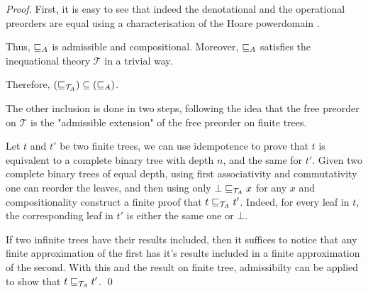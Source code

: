 \begin{proof}
    First, it is easy to see that indeed the denotational
    and the operational preorders are equal using 
    a characterisation of the Hoare powerdomain \cite{abramsky1994}.

    Thus, $\sqsubseteq_A$ is admissible and compositional. Moreover,
    $\sqsubseteq_A$ satisfies the inequational 
    theory $\mathcal{T}$ in a trivial way.

    Therefore, $(\sqsubseteq_{\mathcal{T}_A}) \subseteq (\sqsubseteq_A)$.

    The other inclusion is done in two steps, following the 
    idea that the free preorder on $\mathcal{T}$ is
    the "admissible extension" of the free preorder on finite 
    trees.
    
    Let $t$ and $t'$ be two finite trees, we can use 
    idempotence to prove that $t$ is equivalent to 
    a complete binary tree with depth $n$, and 
    the same for $t'$. Given two complete binary
    trees of equal depth, using first associativity 
    and commutativity one can reorder the leaves, and 
    then using only $\bot \sqsubseteq_{\mathcal{T}_A} x$ for any
    $x$ and compositionality construct 
    a finite proof that $t \sqsubseteq_{\mathcal{T}_A} t'$.
    Indeed, for every leaf in $t$, the corresponding 
    leaf in $t'$ is either the same one or $\bot$.

    
    If two infinite trees have their results included,
    then it suffices to notice that any finite approximation 
    of the first has it's results included in a finite 
    approximation of the second. With this and the result 
    on finite tree, admissibilty can be applied to 
    show that $t \sqsubseteq_{\mathcal{T}_A} t'$. 
\qed\end{proof}



